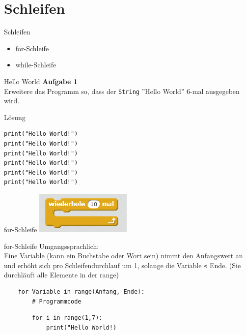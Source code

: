 \section{Schleifen}

\begin{frame}{Schleifen}
\begin{itemize}
	\item for-Schleife
	\item while-Schleife
\end{itemize}
\end{frame}


\begin{frame}[fragile]{Hello World}
\textbf{Aufgabe 1}\\
	Erweitere das Programm so, dass  der \texttt{String} ''Hello World''
	6-mal ausgegeben wird.

\pause{}
\begin{exampleblock}{Lösung}
	\begin{lstlisting}
print("Hello World!")
print("Hello World!")
print("Hello World!")
print("Hello World!")
print("Hello World!")
print("Hello World!")
	\end{lstlisting}
\end{exampleblock}
\end{frame}

\begin{frame}{for-Schleife}
\centering\includegraphics[scale=1.0]{images/for}
\end{frame}


\begin{frame}[fragile]{for-Schleife}
	Umgangssprachlich: \\
	Eine Variable (kann ein Buchstabe oder Wort sein) nimmt den Anfangswert an und erhöht sich pro Schleifendurchlauf um 1, solange die Variable \texttt{<} Ende. (Sie durchläuft alle Elemente in der range)
	
	\begin{lstlisting}
	for Variable in range(Anfang, Ende):
		# Programmcode
	\end{lstlisting}
	
	\begin{lstlisting}
		for i in range(1,7):
			print("Hello World!)
	\end{lstlisting}	
\end{frame}


